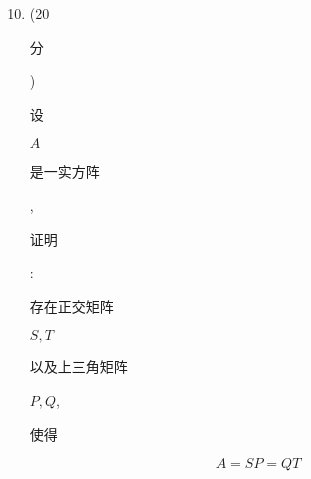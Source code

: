 \documentclass[10pt]{article}
\begin{document}
\begin{enumerate}
  \setcounter{enumi}{9}
  \item (20 \begin{CJK}{UTF8}{mj}分\end{CJK}) \begin{CJK}{UTF8}{mj}设\end{CJK} $A$ \begin{CJK}{UTF8}{mj}是一实方阵\end{CJK}, \begin{CJK}{UTF8}{mj}证明\end{CJK}: \begin{CJK}{UTF8}{mj}存在正交矩阵\end{CJK} $S, T$ \begin{CJK}{UTF8}{mj}以及上三角矩阵\end{CJK} $P, Q$, \begin{CJK}{UTF8}{mj}使得\end{CJK}
\end{enumerate}
$$
A=S P=Q T
$$
\end{document}

